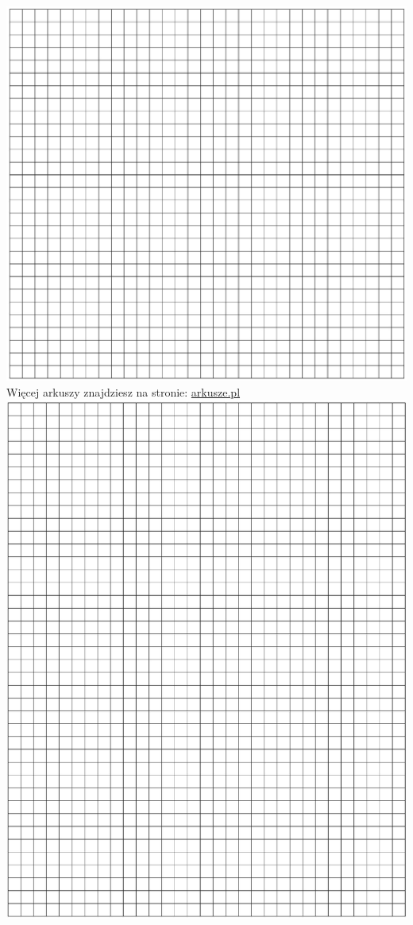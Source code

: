 \documentclass[10pt]{article}
\begin{document}
\includegraphics[max width=\textwidth, center]{2024_11_21_72158d4a4efa7dd894bcg-22(1)}\\
Więcej arkuszy znajdziesz na stronie: \href{http://arkusze.pl}{arkusze.pl}\\
\includegraphics[max width=\textwidth, center]{2024_11_21_72158d4a4efa7dd894bcg-23}
\end{document}
